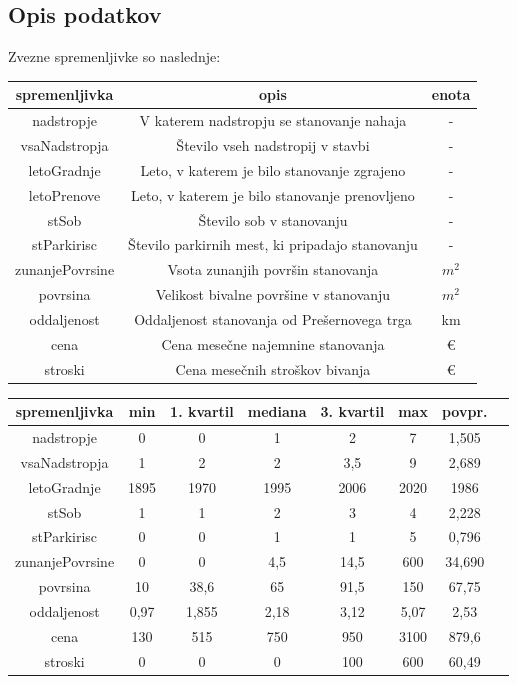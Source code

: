 \documentclass[a4paper, 12pt]{article}
\begin{document}
\subsection{Opis podatkov}

Zvezne spremenljivke so naslednje:
\begin{center}
\begin{tabular}{ c|c|c}
	spremenljivka & opis & enota \\
	\hline
	\hline
	nadstropje & V katerem nadstropju se stanovanje nahaja & - \\
	\hline
	vsaNadstropja & Število vseh nadstropij v stavbi & - \\
	\hline
	letoGradnje & Leto, v katerem je bilo stanovanje zgrajeno & - \\
	\hline
	letoPrenove & Leto, v katerem je bilo stanovanje prenovljeno & - \\
	\hline
	stSob & Število sob v stanovanju & - \\
	\hline
	stParkirisc & Število parkirnih mest, ki pripadajo stanovanju & - \\
	\hline
	zunanjePovrsine & Vsota zunanjih površin stanovanja & $ m^{2} $ \\
	\hline
	povrsina & Velikost bivalne površine v stanovanju & $ m^{2} $ \\
	\hline
	oddaljenost & Oddaljenost stanovanja od Prešernovega trga & km \\
	\hline
	cena & Cena mesečne najemnine stanovanja & \euro \\
	\hline
	stroski & Cena mesečnih stroškov bivanja & \euro \\
\end{tabular}
\end{center}

\begin{center}
\begin{tabular}{ c|ccccccc }
	spremenljivka & min & 1. kvartil & mediana & 3. kvartil & max & povpr. \\
	\hline
	nadstropje & 0 & 0 & 1 & 2 & 7 & 1,505 \\
	vsaNadstropja & 1 & 2 & 2 & 3,5 & 9 & 2,689 \\
	letoGradnje & 1895 & 1970 & 1995 & 2006 & 2020 & 1986 \\
	stSob & 1 & 1 & 2 & 3 & 4 & 2,228 \\
	stParkirisc & 0 & 0 & 1 & 1 & 5 & 0,796 \\
	zunanjePovrsine & 0 & 0 & 4,5 & 14,5 & 600 & 34,690 \\
	povrsina & 10 & 38,6 & 65 & 91,5 & 150 & 67,75 \\
	oddaljenost & 0,97 & 1,855 & 2,18 & 3,12 & 5,07 & 2,53 \\
	cena & 130 & 515 & 750 & 950 & 3100 & 879,6 \\
	stroski & 0 & 0 & 0 & 100 & 600 & 60,49 \\
\end{tabular}
\end{center}
\end{document}
